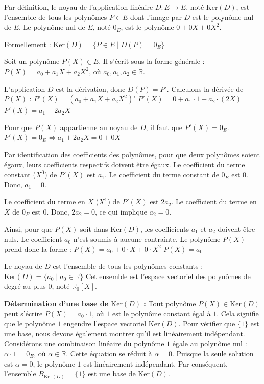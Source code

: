\documentclass{report}
\begin{document}
Par définition, le noyau de l'application linéaire $D: E \to E$, noté $\text{Ker}(D)$, est l'ensemble de tous les polynômes $P \in E$ dont l'image par $D$ est le polynôme nul de $E$. Le polynôme nul de $E$, noté $0_E$, est le polynôme $0 + 0X + 0X^2$.

Formellement :
$\text{Ker}(D) = \{ P \in E \mid D(P) = 0_E \}$

Soit un polynôme $P(X) \in E$. Il s'écrit sous la forme générale :
$P(X) = a_0 + a_1 X + a_2 X^2$, où $a_0, a_1, a_2 \in \mathbb{R}$.

L'application $D$ est la dérivation, donc $D(P) = P'$.
Calculons la dérivée de $P(X)$ :
$P'(X) = (a_0 + a_1 X + a_2 X^2)'$
$P'(X) = 0 + a_1 \cdot 1 + a_2 \cdot (2X)$
$P'(X) = a_1 + 2a_2 X$

Pour que $P(X)$ appartienne au noyau de $D$, il faut que $P'(X) = 0_E$.
$P'(X) = 0_E \iff a_1 + 2a_2 X = 0 + 0X$

Par identification des coefficients des polynômes, pour que deux polynômes soient égaux, leurs coefficients respectifs doivent être égaux.
Le coefficient du terme constant ($X^0$) de $P'(X)$ est $a_1$. Le coefficient du terme constant de $0_E$ est $0$.
Donc, $a_1 = 0$.

Le coefficient du terme en $X$ ($X^1$) de $P'(X)$ est $2a_2$. Le coefficient du terme en $X$ de $0_E$ est $0$.
Donc, $2a_2 = 0$, ce qui implique $a_2 = 0$.

Ainsi, pour que $P(X)$ soit dans $\text{Ker}(D)$, les coefficients $a_1$ et $a_2$ doivent être nuls. Le coefficient $a_0$ n'est soumis à aucune contrainte.
Le polynôme $P(X)$ prend donc la forme :
$P(X) = a_0 + 0 \cdot X + 0 \cdot X^2$
$P(X) = a_0$

Le noyau de $D$ est l'ensemble de tous les polynômes constants :
$\text{Ker}(D) = \{ a_0 \mid a_0 \in \mathbb{R} \}$
Cet ensemble est l'espace vectoriel des polynômes de degré au plus 0, noté $\mathbb{R}_0[X]$.

\textbf{Détermination d'une base de $\text{Ker}(D)$ :}
Tout polynôme $P(X) \in \text{Ker}(D)$ peut s'écrire $P(X) = a_0 \cdot 1$, où $1$ est le polynôme constant égal à $1$.
Cela signifie que le polynôme $1$ engendre l'espace vectoriel $\text{Ker}(D)$.
Pour vérifier que $\{1\}$ est une base, nous devons également montrer qu'il est linéairement indépendant.
Considérons une combinaison linéaire du polynôme $1$ égale au polynôme nul :
$\alpha \cdot 1 = 0_E$, où $\alpha \in \mathbb{R}$.
Cette équation se réduit à $\alpha = 0$.
Puisque la seule solution est $\alpha = 0$, le polynôme $1$ est linéairement indépendant.
Par conséquent, l'ensemble $B_{\text{Ker}(D)} = \{1\}$ est une base de $\text{Ker}(D)$.
\end{document}

